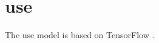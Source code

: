 \section{\ac{use}}\label{sec:impl-use}

The \ac{use} model is based on TensorFlow \cite{HfsentTrans2019}.